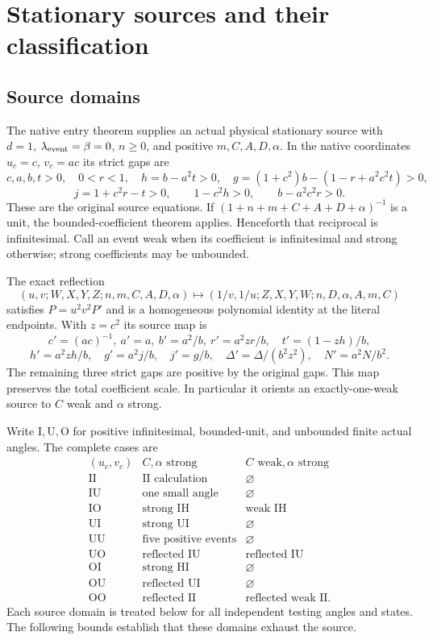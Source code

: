 \section{Stationary sources and their classification}
\subsection{Source domains}
\label{component:pe351eb06b28b}
\label{pe351eb06b28b:sec:c2-complete-source-routing}
The native entry theorem supplies an actual physical stationary source
with $d=1$, $\lambda_{\rm event}=\beta=0$, $n\ge0$, and positive
$m,C,A,D,\alpha$. In the native coordinates $u_c=c$, $v_c=ac$ its
strict gaps are
\[
 c,a,b,t>0,\quad 0<r<1,\quad h=b-a^2t>0,\quad
 g=(1+c^2)b-(1-r+a^2c^2t)>0,
\]
\[
 j=1+c^2r-t>0,\qquad1-c^2h>0,\qquad b-a^2c^2r>0.
\]
These are the original source equations. If
$(1+n+m+C+A+D+\alpha)^{-1}$ is a unit, the bounded-coefficient
theorem applies. Henceforth that reciprocal is infinitesimal.
Call an event weak when its coefficient is infinitesimal and strong
otherwise; strong coefficients may be unbounded.

The exact reflection
\begin{equation}
 (u,v;W,X,Y,Z;n,m,C,A,D,\alpha)
 \longmapsto(1/v,1/u;Z,X,Y,W;n,D,\alpha,A,m,C)
 \label{eq:c2-short-reflection}
\end{equation}
satisfies $P=u^2v^2P'$ and is a homogeneous polynomial identity at
the literal endpoints. With $z=c^2$ its source map is
\[
 c'=(ac)^{-1},\ a'=a,\ b'=a^2/b,\ r'=a^2zr/b,
 \quad t'=(1-zh)/b,
\]
\[
 h'=a^2zh/b,\quad g'=a^2j/b,\quad j'=g/b,
 \quad\Delta'=\Delta/(b^2z^2),\quad N'=a^2N/b^2.
\]
The remaining three strict gaps are positive by the original gaps.
This map preserves the total coefficient scale. In particular it
orients an exactly-one-weak source to $C$ weak and $\alpha$ strong.

Write $\mathrm I,\mathrm U,\mathrm O$ for positive infinitesimal,
bounded-unit, and unbounded finite actual angles. The complete cases are
\[
\begin{array}{c|c|c}
 (u_c,v_c)&C,\alpha\text{ strong}&C\text{ weak},\alpha\text{ strong}\\\hline
 \mathrm{II}&\text{II calculation}&\varnothing\\
 \mathrm{IU}&\text{one small angle}&\varnothing\\
 \mathrm{IO}&\text{strong IH}&\text{weak IH}\\
 \mathrm{UI}&\text{strong UI}&\varnothing\\
 \mathrm{UU}&\text{five positive events}&\varnothing\\
 \mathrm{UO}&\text{reflected IU}&\text{reflected IU}\\
 \mathrm{OI}&\text{strong HI}&\varnothing\\
 \mathrm{OU}&\text{reflected UI}&\varnothing\\
 \mathrm{OO}&\text{reflected II}&\text{reflected weak II}.
\end{array}
\]
Each source domain is treated below for all independent testing angles and
states. The following bounds establish that these domains exhaust the source.

